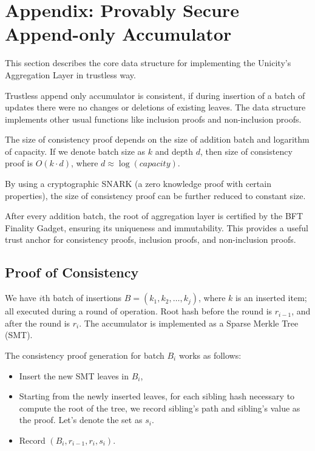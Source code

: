 
\section{Appendix: Provably Secure Append-only Accumulator}

This section describes the core data structure for implementing the Unicity's Aggregation Layer in trustless way.

Trustless append only accumulator is consistent, if during insertion of a batch of updates there were no changes or deletions of existing leaves. The data structure implements other usual functions like inclusion proofs and non-inclusion proofs.

The size of consistency proof depends on the size of addition batch and logarithm of capacity. If we denote batch size as $k$ and depth $d$, then size of consistency proof is $O(k \cdot d)$, where $d \approx \log(capacity)$.

By using a cryptographic SNARK (a zero knowledge proof with certain properties), the size of consistency proof can be further reduced to constant size.

After every addition batch, the root of aggregation layer is certified by the BFT Finality Gadget, ensuring its uniqueness and immutability. This provides a useful trust anchor for consistency proofs, inclusion proofs, and non-inclusion proofs.

\subsection{Proof of Consistency}

We have $i$th batch of insertions $B = (k_1, k_2, \dots, k_j)$, where $k$ is an inserted item; all executed during a round of operation. Root hash before the round is $r_{i-1}$, and after the round is $r_i$. The accumulator is implemented as a Sparse Merkle Tree (SMT).

The consistency proof generation for batch $B_i$ works as follows:

\begin{itemize}
    \item Insert the new SMT leaves in $B_i$,
    \item Starting from the newly inserted leaves, for each sibling hash necessary to compute the root of the tree, we record sibling's path and sibling's value as the proof. Let's denote the set as $s_i$.
    \item Record $(B_i, r_{i-1}, r_i, s_i)$.
\end{itemize}

